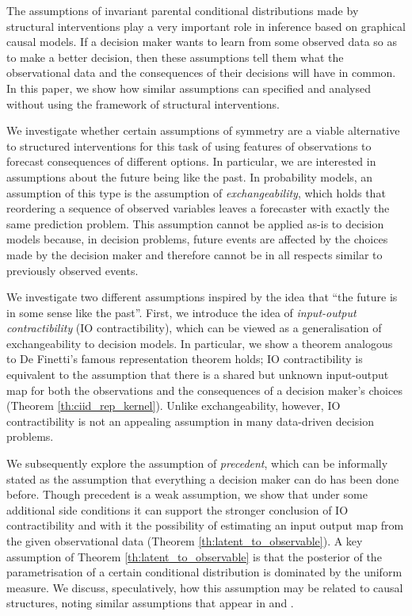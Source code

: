 \documentclass[USenglish,onecolumn]{article}
\begin{document}
The assumptions of invariant parental conditional distributions made by structural interventions play a very important role in inference based on graphical causal models. If a decision maker wants to learn from some observed data so as to make a better decision, then these assumptions tell them what the observational data and the consequences of their decisions will have in common. In this paper, we show how similar assumptions can specified and analysed without using the framework of structural interventions.

We investigate whether certain assumptions of symmetry are a viable alternative to structured interventions for this task of using features of observations to forecast consequences of different options. In particular, we are interested in assumptions about the future being like the past. In probability models, an assumption of this type is the assumption of \emph{exchangeability}, which holds that reordering a sequence of observed variables leaves a forecaster with exactly the same prediction problem. This assumption cannot be applied as-is to decision models because, in decision problems, future events are affected by the choices made by the decision maker and therefore cannot be in all respects similar to previously observed events.

We investigate two different assumptions inspired by the idea that ``the future is in some sense like the past''. First, we introduce the idea of \emph{input-output contractibility} (IO contractibility), which can be viewed as a generalisation of exchangeability to decision models. In particular, we show a theorem analogous to De Finetti's famous representation \citep{de_finetti_foresight_1992} theorem holds; IO contractibility is equivalent to the assumption that there is a shared but unknown input-output map for both the observations and the consequences of a decision maker's choices (Theorem \ref{th:ciid_rep_kernel}). Unlike exchangeability, however, IO contractibility is not an appealing assumption in many data-driven decision problems.

We subsequently explore the assumption of \emph{precedent}, which can be informally stated as the assumption that everything a decision maker can do has been done before. Though precedent is a weak assumption, we show that under some additional side conditions it can support the stronger conclusion of IO contractibility and with it the possibility of estimating an input output map from the given observational data (Theorem \ref{th:latent_to_observable}). A key assumption of Theorem \ref{th:latent_to_observable} is that the posterior of the parametrisation of a certain conditional distribution is dominated by the uniform measure. We discuss, speculatively, how this assumption may be related to causal structures, noting similar assumptions that appear in \citet{meek_strong_1995} and \citet{janzingCausalVersionsMaximum2021}.
\end{document}
